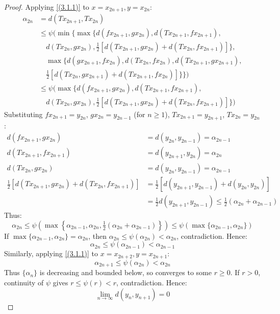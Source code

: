 \documentclass[a4paper,12pt,oneside]{article}
\numberwithin{equation}{section}
\begin{document}
\begin{proof}
Applying \eqref{(3.1.1)} to $x = x_{2n+1}, y = x_{2n}$:
\begin{align*}
\alpha_{2n} &= d(T x_{2n+1}, T x_{2n}) \\
&\leq \psi\Big(\min\Big\{\max\big\{d(fx_{2n+1}, gx_{2n}), d(Tx_{2n+1}, fx_{2n+1}), \\
&\quad d(Tx_{2n}, gx_{2n}), \tfrac{1}{2}[d(Tx_{2n+1}, gx_{2n}) + d(Tx_{2n}, fx_{2n+1})]\big\}, \\
&\quad \max\big\{d(gx_{2n+1}, fx_{2n}), d(Tx_{2n}, fx_{2n}), d(Tx_{2n+1}, gx_{2n+1}), \\
&\quad \tfrac{1}{2}[d(Tx_{2n}, gx_{2n+1}) + d(Tx_{2n+1}, fx_{2n})]\big\}\Big\}\Big) \\
&\leq \psi \Big( \max \big\{ d(f x_{2n+1}, g x_{2n}), d(T x_{2n+1}, f x_{2n+1}), \\
&\quad d(T x_{2n}, g x_{2n}), \tfrac{1}{2}[d(T x_{2n+1}, g x_{2n}) + d(T x_{2n}, f x_{2n+1})] \big\} \Big)
\end{align*}
Substituting $f x_{2n+1} = y_{2n}$, $g x_{2n} = y_{2n-1}$ (for $n \geq 1$), $T x_{2n+1} = y_{2n+1}$, $T x_{2n} = y_{2n}$:
\begin{align*}
d(f x_{2n+1}, g x_{2n}) &= d(y_{2n}, y_{2n-1}) = \alpha_{2n-1} \\
d(T x_{2n+1}, f x_{2n+1}) &= d(y_{2n+1}, y_{2n}) = \alpha_{2n} \\
d(T x_{2n}, g x_{2n}) &= d(y_{2n}, y_{2n-1}) = \alpha_{2n-1} \\
\tfrac{1}{2}[d(T x_{2n+1}, g x_{2n}) + d(T x_{2n}, f x_{2n+1})] &= \tfrac{1}{2}[d(y_{2n+1}, y_{2n-1}) + d(y_{2n}, y_{2n})] \\
&= \tfrac{1}{2} d(y_{2n+1}, y_{2n-1}) \leq \tfrac{1}{2} (\alpha_{2n} + \alpha_{2n-1})
\end{align*}
Thus:
\[
\alpha_{2n} \leq \psi \left( \max \left\{ \alpha_{2n-1}, \alpha_{2n}, \tfrac{1}{2}(\alpha_{2n} + \alpha_{2n-1}) \right\} \right) \leq \psi \left( \max \{\alpha_{2n-1}, \alpha_{2n}\} \right)
\]
If $\max\{\alpha_{2n-1}, \alpha_{2n}\} = \alpha_{2n}$, then $\alpha_{2n} \leq \psi(\alpha_{2n}) < \alpha_{2n}$, contradiction. Hence:
\begin{equation} \label{eq:even-dec}
\alpha_{2n} \leq \psi(\alpha_{2n-1}) < \alpha_{2n-1}
\end{equation}
Similarly, applying \eqref{(3.1.1)} to $x = x_{2n+2}, y = x_{2n+1}$:
\begin{equation} \label{eq:odd-dec}
\alpha_{2n+1} \leq \psi(\alpha_{2n}) < \alpha_{2n}
\end{equation}
Thus $\{\alpha_n\}$ is decreasing and bounded below, so converges to some $r \geq 0$. If $r > 0$, continuity of $\psi$ gives $r \leq \psi(r) < r$, contradiction. Hence:
\begin{equation} \label{eq:dist-conv}
\lim_{n \to \infty} d(y_n, y_{n+1}) = 0
\end{equation}


\end{proof}
\end{document}
